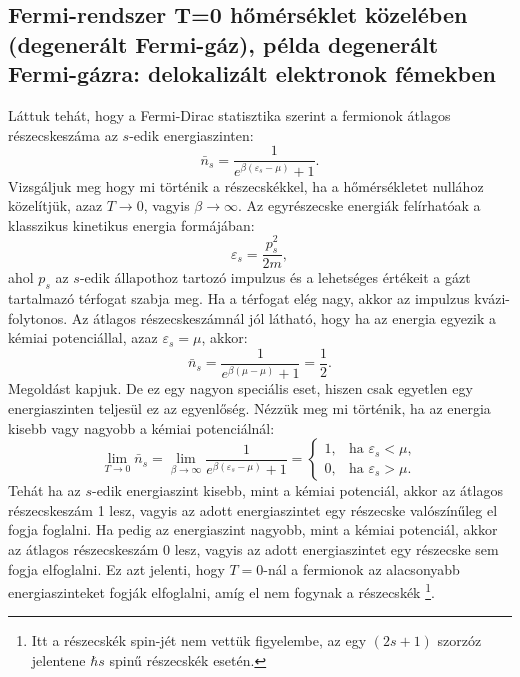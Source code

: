 \documentclass[../main.tex]{subfiles}
\begin{document}
\subsection{Fermi-rendszer T=0 hőmérséklet közelében (degenerált Fermi-gáz), példa degenerált Fermi-gázra: delokalizált elektronok fémekben}
Láttuk tehát, hogy a Fermi-Dirac statisztika szerint a fermionok átlagos részecskeszáma az $s$-edik energiaszinten:
\begin{equation}
    \bar{n}_s = \frac{1}{e^{\beta (\varepsilon_s - \mu)} + 1}.
\end{equation}
Vizsgáljuk meg hogy mi történik a részecskékkel, ha a hőmérsékletet nullához közelítjük, azaz $T \to 0$, vagyis $\beta \to \infty$. Az egyrészecske energiák felírhatóak a klasszikus kinetikus energia formájában:
\begin{equation}
    \varepsilon_s = \frac{p_s^2}{2m},
\end{equation}
ahol $p_s$ az $s$-edik állapothoz tartozó impulzus és a lehetséges értékeit a gázt tartalmazó térfogat szabja meg. Ha a térfogat elég nagy, akkor az impulzus kvázi-folytonos.
Az átlagos részecskeszámnál jól látható, hogy ha az energia egyezik a kémiai potenciállal, azaz $\varepsilon_s = \mu$, akkor:
\begin{equation}
    \bar{n}_s = \frac{1}{e^{\beta (\mu - \mu)} + 1} = \frac{1}{2}.
\end{equation}
Megoldást kapjuk. De ez egy nagyon speciális eset, hiszen csak egyetlen egy energiaszinten teljesül ez az egyenlőség. Nézzük meg mi történik, ha az energia kisebb vagy nagyobb a kémiai potenciálnál:
\begin{equation}
    \lim_{T \to 0} \bar{n}_s = \lim_{\beta \to \infty} \frac{1}{e^{\beta (\varepsilon_s - \mu)} + 1} = 
    \begin{cases}
        1, & \text{ha } \varepsilon_s < \mu, \\
        0, & \text{ha } \varepsilon_s > \mu.
    \end{cases}
\end{equation}
Tehát ha az $s$-edik energiaszint kisebb, mint a kémiai potenciál, akkor az átlagos részecskeszám 1 lesz, vagyis az adott energiaszintet egy részecske valószínűleg el fogja foglalni.
Ha pedig az energiaszint nagyobb, mint a kémiai potenciál, akkor az átlagos részecskeszám 0 lesz, vagyis az adott energiaszintet egy részecske sem fogja elfoglalni. Ez azt jelenti, hogy $T=0$-nál
a fermionok az alacsonyabb energiaszinteket fogják elfoglalni, amíg el nem fogynak a részecskék
\footnote{
    Itt a részecskék spin-jét nem vettük figyelembe, az egy $(2s + 1)$ szorzóz jelentene $\hbar s$ spinű részecskék esetén.
}. 
\end{document}

